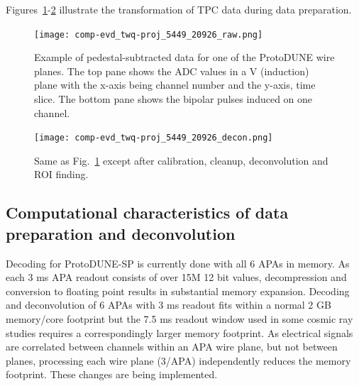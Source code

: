 Figures~\ref{fig:ch-exec-comp-chtraw}-\ref{fig:ch-exec-comp-chtroi} illustrate the transformation of TPC data  during data
preparation.

\begin{figure}[t]
  \texttt{[image: comp-evd\_twq-proj\_5449\_20926\_raw.png]}
  \caption{
    Example of pedestal-subtracted data for one of the ProtoDUNE  wire planes.  The top pane shows the ADC values in a V (induction) plane with the x-axis being channel number and the y-axis, time slice. The bottom pane shows the bipolar pulses induced on one channel.
  }
  \label{fig:ch-exec-comp-chtraw}
\end{figure}





\begin{figure}[t]
  \texttt{[image: comp-evd\_twq-proj\_5449\_20926\_decon.png]}
  \caption{
    Same as Fig.~\ref{fig:ch-exec-comp-chtraw} except after calibration, cleanup, deconvolution and ROI finding.
  }
  \label{fig:ch-exec-comp-chtroi}
\end{figure}


\subsection{Computational characteristics of data preparation and deconvolution }
Decoding for ProtoDUNE-SP is currently done with all 6 APAs in memory. As each 3 ms APA readout consists of over 15M 12 bit values, decompression and conversion to floating point results in substantial memory expansion.  Decoding and deconvolution of 6 APAs with 3 ms readout fits within a normal 2 GB memory/core footprint but the 7.5 ms readout window used in some cosmic ray studies requires a correspondingly larger memory footprint. As electrical signals are correlated between channels within an APA wire plane, but not between planes, processing each wire plane (3/APA) independently reduces the memory footprint.  These changes are being implemented.


